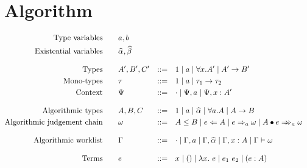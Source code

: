 \section{Algorithm}

$$\begin{aligned}
\text{Type variables}\qquad&a, b\\
\text{Existential variables}\qquad&\a, \b\\[3mm]
\text{Types}\qquad&A', B', C' &::=&\quad 1 \mid a \mid \forall x. A' \mid A'\to B'\\
\text{Mono-types}\qquad&\tau &::=&\quad 1 \mid a \mid \tau_1\to \tau_2\\
\text{Context}\qquad&\P &::=&\quad \cdot \mid \P, a \mid \P, x:A' \color{red} \\[3mm]
\text{Algorithmic types}\qquad&A, B, C &::=&\quad 1 \mid a \mid \a \mid \forall a. A \mid A\to B\\
\text{Algorithmic judgement chain}\qquad&\j &::=&\quad A \le B \mid e\Lto A \mid e\To_{a} \j \mid \appInfAlg{A}{e}{a}{\j}\\[3mm]
\text{Algorithmic worklist}\qquad&\G &::=&\quad \cdot \mid \G, a \mid \G, \a \mid \G, x: A \mid \G \mark \j\\[3mm]
\text{Terms}\qquad&e&::=&\quad x \mid () \mid \lam{x}{e} \mid e_1~e_2 \mid (e:A)
\end{aligned}$$
